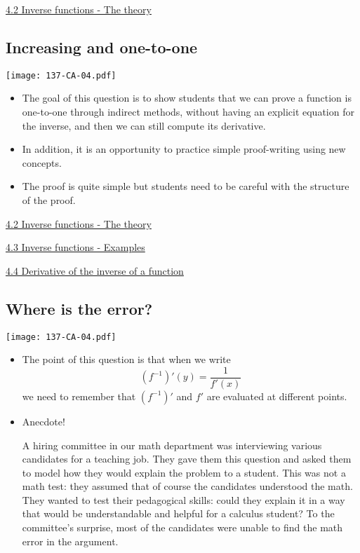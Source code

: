 \documentclass[11pt]{article}
\newcommand{\nl}{\hfill \vspace{-1.1\baselineskip}} %
\newcommand{\vii}{\hspace{8mm} \href{https://www.youtube.com/watch?v=DxecWsEms_c&list=PLlwePzQY_wW-EDeUZebRoA8HGoeZxxpEU&index=2}{4.2 Inverse functions - The theory}}
\newcommand{\viii}{\hspace{8mm} \href{https://www.youtube.com/watch?v=bnsVbyLUZqs&list=PLlwePzQY_wW-EDeUZebRoA8HGoeZxxpEU&index=3}{4.3 Inverse functions - Examples}}
\newcommand{\viv}{\hspace{8mm} \href{https://www.youtube.com/watch?v=BMXesqZ_XCA&list=PLlwePzQY_wW-EDeUZebRoA8HGoeZxxpEU&index=4}{4.4 Derivative of the inverse of a function}}
\begin{document}
\begin{videos}
\vii
\end{videos}

\newpage

\subsection{Increasing and one-to-one}

\begin{center}
{ \texttt{[image: 137-CA-04.pdf]}} 
\end{center}

\begin{comments}
\nl
\begin{itemize}
	\item The goal of this question is to show students that we can prove a function is one-to-one through indirect methods, without having an explicit equation for the inverse, and then we can still compute its derivative.
	\item In addition, it is an opportunity to practice simple proof-writing using new concepts.  
	\item   The proof is quite simple but students need to be careful with the structure of the proof.
\end{itemize}	
\end{comments}

\begin{videos}
\vii

\viii

\viv
\end{videos}

\newpage
\subsection{Where is the error?} 

\begin{center}
{ \texttt{[image: 137-CA-04.pdf]}} 
\end{center}

\begin{comments}
\nl
\begin{itemize}
	\item   The point of this question is that when we write
		$$
			(f^{-1})'(y) = \frac{1}{f'(x)}
		$$
		we need to remember that $\left(f^{-1}\right)'$ and $f'$ are evaluated at different points.
	\item Anecdote!  
	
		A hiring committee in our math department was interviewing various candidates for a teaching job.  They gave them this question and asked them  to model how they would explain the problem to a student.  This was not a math test: they assumed that of course the candidates understood the math.  They wanted to test their pedagogical skills: could they explain it in a way that would be understandable and helpful for a calculus student?  To the committee's surprise, most of the candidates were unable to find the math error in the argument.
\end{itemize}	
\end{comments}
\end{document}

